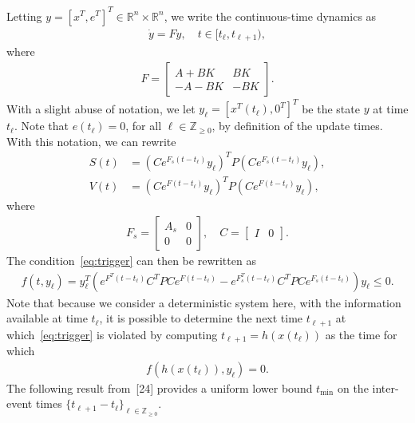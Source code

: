 \documentclass[]{book}
\newcommand{\real}{{\mathbb{R}}}
\newcommand{\integernonnegative}{\mathbb{Z}_{\ge 0}}
\begin{document}
Letting $y = [x^T, e^T]^T \in \real^n \times \real^n$, we write the
continuous-time dynamics as
\begin{align*}
  \dot{y} = Fy , \quad t \in [t_\ell,t_{\ell+1}) ,
\end{align*}
where
\begin{align*}
  F = \left[
    \begin{array}{cc}
      A+BK & BK
      \\
      -A - BK & -BK
    \end{array}
  \right] .
\end{align*}
With a slight abuse of notation, we let $y_\ell = [x^T(t_\ell),
0^T]^T$ be the state $y$ at time $t_\ell$. Note that $e(t_\ell) = 0$,
for all $\ell \in \integernonnegative$, by definition of the update
times. With this notation, we can rewrite
\begin{align*}
  S(t) &= (C e^{F_s (t-t_\ell)} y_\ell)^T P (C e^{F_s (t-t_\ell)}
  y_\ell),
  \\
  V(t) &= (C e^{F (t-t_\ell)} y_\ell)^T P (C e^{F (t-t_\ell)} y_\ell)
  ,
\end{align*}
where
\begin{align*}
  F_s =
  \begin{bmatrix}
          A_s & 0
      \\
      0 & 0
  \end{bmatrix}
  , \quad C =
  \begin{bmatrix}
    I & 0
  \end{bmatrix}
.
\end{align*}
The condition~\eqref{eq:trigger} can then be rewritten as
\begin{align*}
  f(t,y_\ell) = y_\ell^T ( e^{F^T (t-t_\ell)} C^T P C e^{F (t-t_\ell)}
  - e^{F_s^T (t-t_\ell)} C^T P C e^{F_s (t-t_\ell)} )y_\ell \leq 0 .
\end{align*}
Note that because we consider a deterministic system here, with the 
information available at time $t_\ell$,
it is possible to determine the next time $t_{\ell+1}$ at
which~\eqref{eq:trigger} is violated by computing $t_{\ell+1} = h(x(t_\ell))$
as the time for which
\begin{align}\label{eq:selftrigger}
  f(h(x(t_\ell)), y_\ell) = 0.
\end{align}
The following result from~[24] provides a uniform
lower bound $t_\text{min}$ on the inter-event times $\{t_{\ell+1} -
t_\ell\}_{\ell \in \integernonnegative}$.
\end{document}
